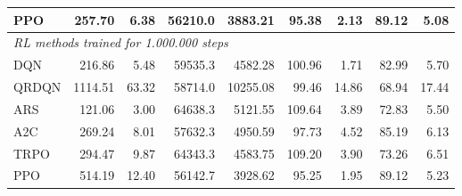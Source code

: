 \begin{samepage}
\begin{center}
\begin{tabular}{l|rr|rr|rr|rr}
    PPO          &   257.70 &     6.38 &    56210.0 &    3883.21 &   95.38 &    2.13 &   89.12 &    5.08 \\
    \midrule
    \multicolumn{9}{l}{\textit{RL methods trained for 1.000.000 steps}} \\
    \midrule
    DQN          &   216.86 &     5.48 &    59535.3 &    4582.28 &  100.96 &    1.71 &   82.99 &    5.70 \\
    QRDQN        &  1114.51 &    63.32 &    58714.0 &   10255.08 &   99.46 &   14.86 &   68.94 &   17.44 \\
    ARS          &   121.06 &     3.00 &    64638.3 &    5121.55 &  109.64 &    3.89 &   72.83 &    5.50 \\
    A2C          &   269.24 &     8.01 &    57632.3 &    4950.59 &   97.73 &    4.52 &   85.19 &    6.13 \\
    TRPO         &   294.47 &     9.87 &    64343.3 &    4583.75 &  109.20 &    3.90 &   73.26 &    6.51 \\
    PPO          &   514.19 &    12.40 &    56142.7 &    3928.62 &   95.25 &    1.95 &   89.12 &    5.23 \\
    \bottomrule
  \end{tabular}
\end{center}
\end{samepage}


